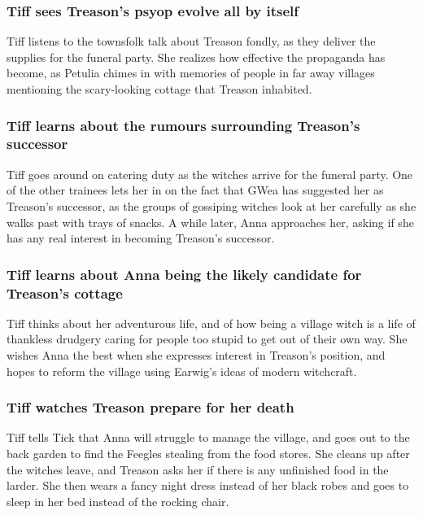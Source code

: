 \subsubsection{\Gls{Tiff} sees \Gls{Treason}'s psyop evolve all by itself}
\Gls{Tiff} listens to the townsfolk talk about \Gls{Treason} fondly, as they deliver the supplies
for the funeral party. She realizes how effective the propaganda has become, as \Gls{Petulia} chimes
in with memories of people in far away villages mentioning the scary-looking cottage that
\Gls{Treason} inhabited.

\subsubsection{\Gls{Tiff} learns about the rumours surrounding \Gls{Treason}'s successor}
\Gls{Tiff} goes around on catering duty as the witches arrive for the funeral party. One of the
other trainees lets her in on the fact that \Gls{GWea} has suggested her as \Gls{Treason}'s
successor, as the groups of gossiping witches look at her carefully as she walks past with trays
of snacks. A while later, \Gls{Anna} approaches her, asking if she has any real interest in becoming
\Gls{Treason}'s successor.

\subsubsection{\Gls{Tiff} learns about \Gls{Anna} being the likely candidate for \Gls{Treason}'s
    cottage}
\Gls{Tiff} thinks about her adventurous life, and of how being a village witch is a life of
thankless drudgery caring for people too stupid to get out of their own way. She wishes \Gls{Anna}
the best when she expresses interest in \Gls{Treason}'s position, and hopes to reform the village
using \Gls{Earwig}'s ideas of modern witchcraft.

\subsubsection{\Gls{Tiff} watches \Gls{Treason} prepare for her death}
\Gls{Tiff} tells \Gls{Tick} that \Gls{Anna} will struggle to manage the village, and goes out to
the back garden to find the Feegles stealing from the food stores. She cleans up after the witches
leave, and \Gls{Treason} asks her if there is any unfinished food in the larder. She then wears a
fancy night dress instead of her black robes and goes to sleep in her bed instead of the rocking
chair.

